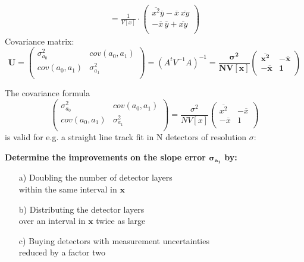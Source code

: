 \begin{slide}
\begin{eqnarray*}
= 
\frac{1}{V[x]} \cdot
\left( 
\begin{array}{l} 
\overline{x^2} \overline{y} - \overline{x}\, \overline{xy} \\
-\overline{x}\,\overline{y} + \overline{xy} \\
\end{array}
\right) 
\end{eqnarray*}
Covariance matrix:
\[ \pmb{U} = \left(
\begin{array}{ll}
\sigma_{a_0}^2 & cov(a_0,a_1) \\
cov(a_0,a_1) & \sigma_{a_1}^2 \\
\end{array}
\right)  = (A^t V^{-1} A )^{-1} = \pmb{\frac{\sigma^2}{N V[x]} 
\left( \begin{array}{lr}
\overline{x^2} & -\overline{x} \\
-\overline{x} & 1 \\
\end{array}
\right) 
}
\]
\end{slide}

\begin{slide}
\Large
\pagestyle{headings}
\sf
{}
\noindent
The covariance formula 
\[ 
 \left(
\begin{array}{ll}
\sigma_{a_0}^2 & cov(a_0,a_1) \\
cov(a_0,a_1) & \sigma_{a_1}^2 \\
\end{array}
\right) = 
\frac{\sigma^2}{N V[x]}
\left( \begin{array}{lr}
\overline{x^2} & -\overline{x} \\
-\overline{x} & 1 \\
\end{array}
\right) 
\]
is valid for e.g. a straight line track fit  
in N detectors of resolution $\sigma$:

{
\darkgreen 
\bfseries \large
 Determine  
the improvements on the slope error  $\pmb{\sigma_{a_1}}$
by:
\begin{itemize}
\item[a)] 
Doubling the number of detector layers\\ within the same interval
in $\pmb{x}$
\item[b)] Distributing the detector layers\\ over an interval in
$\pmb{x}$ twice as large
\item[c)] 
Buying detectors with measurement uncertainties\\ reduced by a factor two
\end{itemize}
}
\end{slide}


